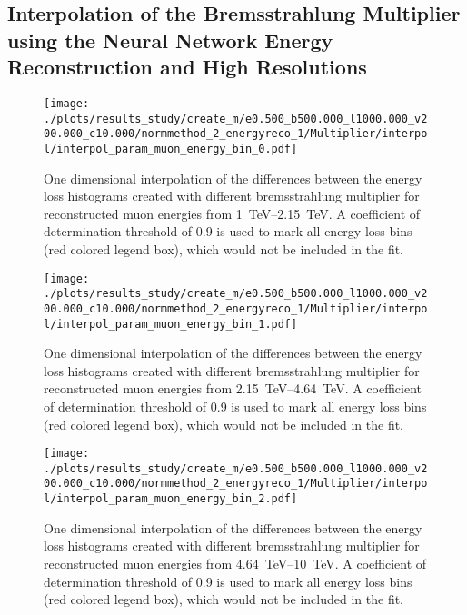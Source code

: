 %

\subsection{Interpolation of the Bremsstrahlung Multiplier using the Neural Network Energy Reconstruction and High Resolutions}

\begin{figure}[H]
    \centering
    \texttt{[image: ./plots/results\_study/create\_m/e0.500\_b500.000\_l1000.000\_v200.000\_c10.000/normmethod\_2\_energyreco\_1/Multiplier/interpol/interpol\_param\_muon\_energy\_bin\_0.pdf]}
    \caption{One dimensional interpolation of the differences between the energy loss histograms created with different bremsstrahlung multiplier for reconstructed muon energies from \SIrange{1}{2.15}{TeV}. A coefficient of determination threshold of \num{0.9} is used to mark all energy loss bins (red colored legend box), which would not be included in the fit.}
    \label{fig:study_1d_interpol_mu0_nn_high}
\end{figure}

\begin{figure}[H]
    \centering
    \texttt{[image: ./plots/results\_study/create\_m/e0.500\_b500.000\_l1000.000\_v200.000\_c10.000/normmethod\_2\_energyreco\_1/Multiplier/interpol/interpol\_param\_muon\_energy\_bin\_1.pdf]}
    \caption{One dimensional interpolation of the differences between the energy loss histograms created with different bremsstrahlung multiplier for reconstructed muon energies from \SIrange{2.15}{4.64}{TeV}. A coefficient of determination threshold of \num{0.9} is used to mark all energy loss bins (red colored legend box), which would not be included in the fit.}
    \label{fig:study_1d_interpol_mu1_nn_high}
\end{figure}

\begin{figure}[H]
    \centering
    \texttt{[image: ./plots/results\_study/create\_m/e0.500\_b500.000\_l1000.000\_v200.000\_c10.000/normmethod\_2\_energyreco\_1/Multiplier/interpol/interpol\_param\_muon\_energy\_bin\_2.pdf]}
    \caption{One dimensional interpolation of the differences between the energy loss histograms created with different bremsstrahlung multiplier for reconstructed muon energies from \SIrange{4.64}{10}{TeV}. A coefficient of determination threshold of \num{0.9} is used to mark all energy loss bins (red colored legend box), which would not be included in the fit.}
    \label{fig:study_1d_interpol_mu2_nn_high}
\end{figure}

